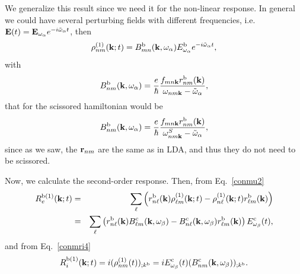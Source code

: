 \documentclass{article}
\begin{document}
We generalize this result since we need it for the non-linear response.
In general we could have several perturbing fields with different
frequencies,
i.e. $\mathbf{E}(t)=\mathbf{E}_{\omega_\alpha} e^{-i\tilde\omega_\alpha t}$, then
\begin{equation}\label{rhonoi1}
\rho^{(1)}_{nm}(\mathbf{k};t)=B^{\mathrm{b}}_{mn}(\mathbf{k},\omega_\alpha)E_{\omega_\alpha}^{\mathrm{b}}e^{-i\tilde\omega_\alpha t}
,
\end{equation}
with
\begin{equation}\label{rho1} 
B^{\mathrm{b}}_{nm}(\mathbf{k},\omega_\alpha)=\frac{e}{\hbar}\frac{f_{mn\mathbf{k}}r^{\mathrm{b}}_{nm}(\mathbf{k})}{\omega_{nm\mathbf{k}}-\tilde\omega_\alpha}
,
\end{equation} 
that for the scissored hamiltonian would be
\begin{equation}\label{rho1n}
B^{\mathrm{b}}_{nm}(\mathbf{k},\omega_\alpha)=\frac{e}{\hbar}\frac{f_{mn\mathbf{k}}r^{\mathrm{b}}_{nm}(\mathbf{k})}{\omega^S_{nm\mathbf{k}}-\tilde\omega_\alpha}
,
\end{equation}
since as we saw, the $\mathbf{r}_{nm}$ are the same as in LDA, and thus they
do not need to be scissored.

Now, we calculate the second-order response. Then, from Eq.~\eqref{conmu2}
\begin{eqnarray}\label{R1e}
R_e^{\mathrm{b}(1)}(\mathbf{k};t)
&=&
\sum_{\ell}
\left(
r^{\mathrm{b}}_{n\ell}(\mathbf{k})
{\rho}^{(1)}_{\ell m}(\mathbf{k};t)
-
{\rho}^{(1)}_{n\ell}(\mathbf{k};t)
r^{\mathrm{b}}_{\ell m}(\mathbf{k})
\right)
\nonumber \\
&=&
\sum_{\ell}
\left(
r^{\mathrm{b}}_{n\ell}(\mathbf{k})
B^{\mathrm{c}}_{\ell m}(\mathbf{k},\omega_\beta)
-
B^{\mathrm{c}}_{n\ell}(\mathbf{k},\omega_\beta)
r^{\mathrm{b}}_{\ell m}(\mathbf{k})
\right)E_{\omega_\beta}^{\mathrm{c}}(t)
,
\end{eqnarray}
and from Eq.~\eqref{conmri4}
\begin{equation}\label{R1i}
R_i^{\mathrm{b}(1)}(\mathbf{k};t)=i(\rho^{(1)}_{nm}(t))_{;k^{\mathrm{b}}}=iE_{\omega_\beta}^{\mathrm{c}}(t)(B^{\mathrm{c}}_{nm}(\mathbf{k},\omega_\beta))_{;k^{\mathrm{b}}}
.
\end{equation}
\end{document}
